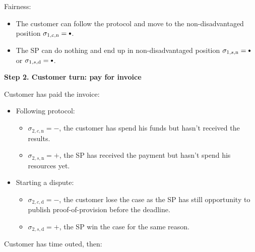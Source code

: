 \documentclass{ieeeaccess}
\newcommand\sbullet[1][.75]{\mathbin{\ThisStyle{\vcenter{\hbox{%
  \scalebox{#1}{$\SavedStyle\bullet$}}}}}%
}
\begin{document}
Fairness:

\begin{itemize}

\item
  The customer can follow the protocol and move to the non-disadvantaged
  position \(\sigma_{1, c, \mathrm{n}} = \sbullet\).
\item
  The SP can do nothing and end up in non-disadvantaged position
  \(\sigma_{1, s, \mathrm{n}} = \sbullet \) or
  \(\sigma_{1, s, \mathrm{d}} = \sbullet \).
\end{itemize}

\noindent \textbf
{Step 2. Customer turn: pay for invoice}\label{step-2-pay-for-invoice}

Customer has paid the invoice:

\begin{itemize}
\item
  Following protocol:
  \begin{itemize}
  \item
    \(\sigma_{2, c, \mathrm{n}} = -\), the customer has spend his funds but hasn't received the results.
  \item
    \(\sigma_{2, s, \mathrm{n}} = +\), the SP has received the payment but hasn't spend his resources yet.
  \end{itemize}
\item
  Starting a dispute:

  \begin{itemize}
  \item
    \(\sigma_{2, c, \mathrm{d}} = -\), the customer lose the case as the SP has still opportunity to publish proof-of-provision before the deadline.
  \item
    \(\sigma_{2, s, \mathrm{d}} = +\), the SP win the case for the same reason.
  \end{itemize}
\end{itemize}

Customer has time outed, then:
\end{document}
